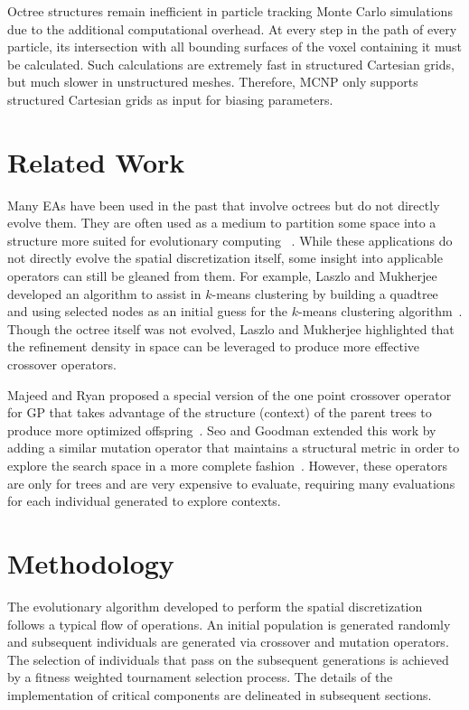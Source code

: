 \documentclass[conference]{IEEEtran}
\begin{document}
Octree structures remain inefficient in particle tracking Monte Carlo simulations due to the additional computational overhead. At every step in the path of every particle, its intersection with all bounding surfaces of the voxel containing it must be calculated. Such calculations are extremely fast in structured Cartesian grids, but much slower in unstructured meshes. Therefore, MCNP only supports structured Cartesian grids as input for biasing parameters.

\section{Related Work}
Many EAs have been used in the past that involve octrees but do not directly evolve them. They are often used as a medium to partition some space into a structure more suited for evolutionary computing ~\cite{ref:Zhu2015301, ref:Schwertfeger200853}. While these applications do not directly evolve the spatial discretization itself, some insight into applicable operators can still be gleaned from them. For example, Laszlo and Mukherjee developed an algorithm to assist in $k$-means clustering by building a quadtree and using selected nodes as an initial guess for the $k$-means clustering algorithm~\cite{ref:Laszlo2006}. Though the octree itself was not evolved, Laszlo and Mukherjee highlighted that the refinement density in space can be leveraged to produce more effective crossover operators.

Majeed and Ryan proposed a special version of the one point crossover operator for GP that takes advantage of the structure (context) of the parent trees to produce more optimized offspring~\cite{ref:Majeed2007}. Seo and Goodman extended this work by adding a similar mutation operator that maintains a structural metric in order to explore the search space in a more complete fashion~\cite{ref:seo2009}. However, these operators are only for trees and are very expensive to evaluate, requiring many evaluations for each individual generated to explore contexts.

\section{Methodology}\label{sec:methodology}
The evolutionary algorithm developed to perform the spatial discretization follows a typical flow of operations. An initial population is generated randomly and subsequent individuals are generated via crossover and mutation operators. The selection of individuals that pass on the subsequent generations is achieved by a fitness weighted tournament selection process. The details of the implementation of critical components are delineated in subsequent sections.
\end{document}
